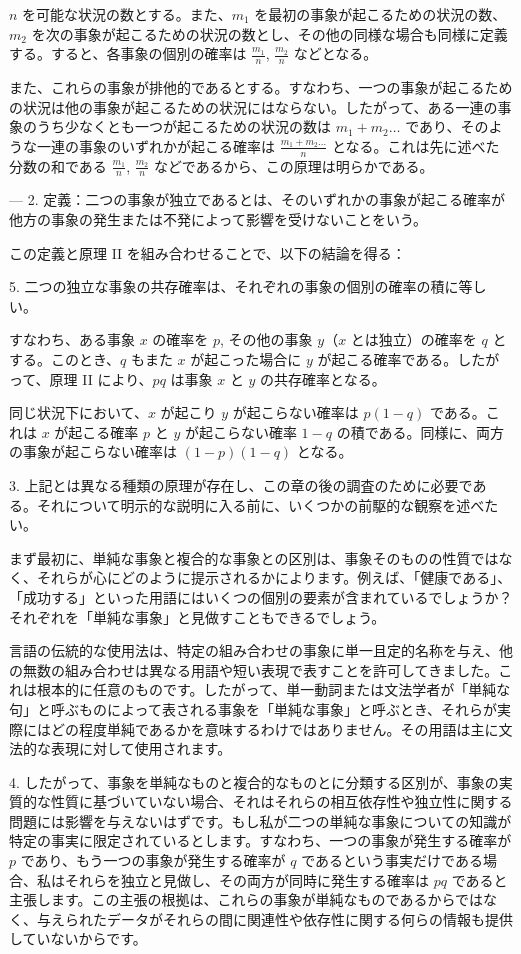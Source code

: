 \documentclass[a4paper,11pt,openany]{ltjsbook}
\begin{document}
$n$ を可能な状況の数とする。また、$m_1$ を最初の事象が起こるための状況の数、$m_2$ を次の事象が起こるための状況の数とし、その他の同様な場合も同様に定義する。すると、各事象の個別の確率は $\frac{m_1}{n}$, $\frac{m_2}{n}$ などとなる。

また、これらの事象が排他的であるとする。すなわち、一つの事象が起こるための状況は他の事象が起こるための状況にはならない。したがって、ある一連の事象のうち少なくとも一つが起こるための状況の数は $m_1 + m_2 \dotsc$ であり、そのような一連の事象のいずれかが起こる確率は $\frac{m_1 + m_2 \dotsc}{n}$ となる。これは先に述べた分数の和である $\frac{m_1}{n}$, $\frac{m_2}{n}$ などであるから、この原理は明らかである。

---
2. 定義：二つの事象が独立であるとは、そのいずれかの事象が起こる確率が他方の事象の発生または不発によって影響を受けないことをいう。

この定義と原理 II を組み合わせることで、以下の結論を得る：

5. 二つの独立な事象の共存確率は、それぞれの事象の個別の確率の積に等しい。

すなわち、ある事象 $x$ の確率を $p$, その他の事象 $y$（$x$ とは独立）の確率を $q$ とする。このとき、$q$ もまた $x$ が起こった場合に $y$ が起こる確率である。したがって、原理 II により、$pq$ は事象 $x$ と $y$ の共存確率となる。

同じ状況下において、$x$ が起こり $y$ が起こらない確率は $p(1-q)$ である。これは $x$ が起こる確率 $p$ と $y$ が起こらない確率 $1-q$ の積である。同様に、両方の事象が起こらない確率は $(1-p)(1-q)$ となる。

3. 上記とは異なる種類の原理が存在し、この章の後の調査のために必要である。それについて明示的な説明に入る前に、いくつかの前駆的な観察を述べたい。

まず最初に、単純な事象と複合的な事象との区別は、事象そのものの性質ではなく、それらが心にどのように提示されるかによります。例えば、「健康である」、「成功する」といった用語にはいくつの個別の要素が含まれているでしょうか？それぞれを「単純な事象」と見做すこともできるでしょう。

言語の伝統的な使用法は、特定の組み合わせの事象に単一且定的名称を与え、他の無数の組み合わせは異なる用語や短い表現で表すことを許可してきました。これは根本的に任意のものです。したがって、単一動詞または文法学者が「単純な句」と呼ぶものによって表される事象を「単純な事象」と呼ぶとき、それらが実際にはどの程度単純であるかを意味するわけではありません。その用語は主に文法的な表現に対して使用されます。

4. したがって、事象を単純なものと複合的なものとに分類する区別が、事象の実質的な性質に基づいていない場合、それはそれらの相互依存性や独立性に関する問題には影響を与えないはずです。もし私が二つの単純な事象についての知識が特定の事実に限定されているとします。すなわち、一つの事象が発生する確率が \( p \) であり、もう一つの事象が発生する確率が \( q \) であるという事実だけである場合、私はそれらを独立と見做し、その両方が同時に発生する確率は \( pq \) であると主張します。この主張の根拠は、これらの事象が単純なものであるからではなく、与えられたデータがそれらの間に関連性や依存性に関する何らの情報も提供していないからです。
\end{document}
